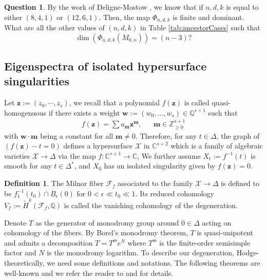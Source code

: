 \documentclass[12pt, letterpaper]{amsart}
\theoremstyle{plain}
\theoremstyle{definition}
\newtheorem{definition}[theorem]{Definition}
\newtheorem{question}[theorem]{Question}
\begin{document}
\begin{question}
By the work of Deligne-Mostow \cite{DM86}, we know that if $n,d,k$ is equal to either 
$(8,4,1)$ or $(12,6,1)$. Then, the map $\Phi_{n,d,k}$ is finite and dominant. 
What are all the other values of $(n,d,k)$ in Table \ref{tab:ancestorCases} such that 
\[
\dim
\left(
\Phi_{n,d,k}
\left(
M_{0,n}
\right)
\right)
= (n-3)?
\]
\end{question}


\subsection{Eigenspectra of isolated hypersurface singularities}
Let $\mathbf{z} := (z_0, \cdots, z_s)$, 
we recall that a polynomial $f(\mathbf{z})$ is called quasi-homogenuous if there exists a weight $\mathbf{w}:=(w_0,...,w_s)\in \mathbb{Q}^{s+1}$ such that 
\begin{align*}
f(\mathbf{z})=\sum a_{\mathbf{m}}\mathbf{z}^{\mathbf{m}}, 
&&
\mathbf{m}\in \mathbb{Z}_{\geq 0}^{s+1}    
\end{align*}
with $\mathbf{w}\cdot \mathbf{m}$ being a constant for all $\mathbf{m}\neq 0$. 
Therefore, for any $t \in \Delta$, the graph of $(f(\mathbf{z})-t=0)$ defines a hypersurface $\mathcal{X}$ in $\mathbb{C}^{s+2}$
which is a family of algebraic varieties 
$\mathcal{X} \to \Delta$
via the map
$f: \mathbb{C}^{s+1}\rightarrow \mathbb{C}$,
We further assume $X_t:=f^{-1}(t)$ is smooth for any $t\in \Delta^*$, and $X_0$ has an isolated singularity given by $f(\mathbf{z})=0$.

\begin{definition}
The Milnor fiber $\mathcal{F}_f$ associated to the family $\mathcal{X}\rightarrow \Delta$ is defined to be $f_1^{-1}(t_0)\cap B_{\epsilon}(0)$ for 
$0<\epsilon \ll t_0 \ll 1$. Its reduced cohomology $V_f:=\tilde{H}^k(\mathcal{F}_f, \mathbb{Q})$ is called the vanishing cohomology of the degeneration.
\end{definition}


Denote $T$ as the generator of monodromy group around $0\in \Delta$ acting on cohomology of the fibers. By Borel's monodromy theorem, $T$ is quasi-unipotent and admits a decomposition $T=T^{\text{ss}}e^N$ where $T^{\text{ss}}$ is the finite-order semisimple factor and $N$ is the monodromy logarithm. To describe our degeneration, Hodge-theoretically, we need some definitions and notations. 
The following theorems are well-known and
we refer the reader to \cite{KL20} and \cite{PS08} for details.
\end{document}
